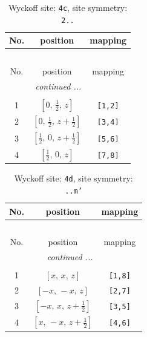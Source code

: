 \documentclass[fleqn,8pt]{jsarticle}
\begin{document}
\renewcommand{\arraystretch}{1.2}
\begin{longtable}{ccc}
\caption{Wyckoff site: {\tt 4c}, site symmetry: {\tt 2..}}
 \\
 \hline \hline
No. & position & mapping \\ \hline \endfirsthead

\multicolumn{2}{l}{\tablename\ \thetable{}} \\
 \hline \hline
No. & position & mapping \\ \hline \endhead

 \hline \hline
\multicolumn{2}{r}{\footnotesize\it continued ...} \\ \endfoot

 \hline \hline
\multicolumn{2}{r}{} \\ \endlastfoot

1 & $\left[ 0,\, \frac{1}{2},\, z \right]$ & {\tt [1,2]} \\ \hline
2 & $\left[ 0,\, \frac{1}{2},\, z + \frac{1}{2} \right]$ & {\tt [3,4]} \\ \hline
3 & $\left[ \frac{1}{2},\, 0,\, z + \frac{1}{2} \right]$ & {\tt [5,6]} \\ \hline
4 & $\left[ \frac{1}{2},\, 0,\, z \right]$ & {\tt [7,8]} \\
\end{longtable}
\renewcommand{\arraystretch}{1.2}
\begin{longtable}{ccc}
\caption{Wyckoff site: {\tt 4d}, site symmetry: {\tt ..m'}}
 \\
 \hline \hline
No. & position & mapping \\ \hline \endfirsthead

\multicolumn{2}{l}{\tablename\ \thetable{}} \\
 \hline \hline
No. & position & mapping \\ \hline \endhead

 \hline \hline
\multicolumn{2}{r}{\footnotesize\it continued ...} \\ \endfoot

 \hline \hline
\multicolumn{2}{r}{} \\ \endlastfoot

1 & $\left[ x,\, x,\, z \right]$ & {\tt [1,8]} \\ \hline
2 & $\left[ - x,\, - x,\, z \right]$ & {\tt [2,7]} \\ \hline
3 & $\left[ - x,\, x,\, z + \frac{1}{2} \right]$ & {\tt [3,5]} \\ \hline
4 & $\left[ x,\, - x,\, z + \frac{1}{2} \right]$ & {\tt [4,6]} \\
\end{longtable}
\end{document}

